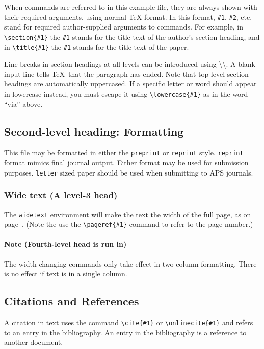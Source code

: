 \documentclass[%
 reprint,
 amsmath,amssymb,
 aps,
]{revtex4-2}
\begin{document}
When commands are referred to in this example file, they are always
shown with their required arguments, using normal \TeX{} format. In
this format, \verb+#1+, \verb+#2+, etc. stand for required
author-supplied arguments to commands. For example, in
\verb+\section{#1}+ the \verb+#1+ stands for the title text of the
author's section heading, and in \verb+\title{#1}+ the \verb+#1+
stands for the title text of the paper.

Line breaks in section headings at all levels can be introduced using
\textbackslash\textbackslash. A blank input line tells \TeX\ that the
paragraph has ended. Note that top-level section headings are
automatically uppercased. If a specific letter or word should appear in
lowercase instead, you must escape it using \verb+\lowercase{#1}+ as
in the word ``via'' above.

\subsection{\label{sec:level2}Second-level heading: Formatting}

This file may be formatted in either the \texttt{preprint} or
\texttt{reprint} style. \texttt{reprint} format mimics final journal output. 
Either format may be used for submission purposes. \texttt{letter} sized paper should
be used when submitting to APS journals.

\subsubsection{Wide text (A level-3 head)}
The \texttt{widetext} environment will make the text the width of the
full page, as on page~\pageref{eq:wideeq}. (Note the use the
\verb+\pageref{#1}+ command to refer to the page number.) 
\paragraph{Note (Fourth-level head is run in)}
The width-changing commands only take effect in two-column formatting. 
There is no effect if text is in a single column.

\subsection{\label{sec:citeref}Citations and References}
A citation in text uses the command \verb+\cite{#1}+ or
\verb+\onlinecite{#1}+ and refers to an entry in the bibliography. 
An entry in the bibliography is a reference to another document.
\end{document}
